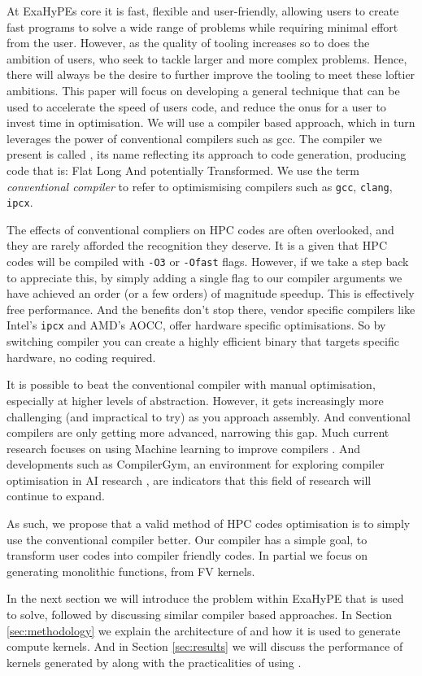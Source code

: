 At ExaHyPEs core it is fast, flexible and user-friendly, allowing users to create fast programs to solve a wide range of problems while requiring minimal effort from the user.
However, as the quality of tooling increases so to does the ambition of users, who seek to tackle larger and more complex problems.
Hence, there will always be the desire to further improve the tooling to meet these loftier ambitions.
This paper will focus on developing a general technique that can be used to accelerate the speed of users code, and reduce the onus for a user to invest time in optimisation.
We will use a compiler based approach, which in turn leverages the power of conventional compilers such as gcc.
The compiler we present is called \phlat, its name reflecting its approach to code generation, producing code that is: Flat Long And potentially Transformed. 
We use the term \textit{conventional compiler} to refer to optimismising compilers such as \texttt{gcc}, \texttt{clang}, \texttt{ipcx}.  


The effects of conventional compliers on HPC codes are often overlooked, and they are rarely afforded the recognition they deserve.
It is a given that HPC codes will be compiled with \texttt{-O3} or \texttt{-Ofast} flags.
However, if we take a step back to appreciate this, by simply adding a single flag to our compiler arguments we have achieved an order (or a few orders) of magnitude speedup.
This is effectively free performance.
And the benefits don't stop there, vendor specific compilers like Intel's \texttt{ipcx} and AMD's AOCC, offer hardware specific optimisations.
So by switching compiler you can create a highly efficient binary that targets specific hardware, no coding required.

It is possible to beat the conventional compiler with manual optimisation, especially at higher levels of abstraction.
However, it gets increasingly more challenging (and impractical to try) as you approach assembly.
And conventional compilers are only getting more advanced, narrowing this gap.   
Much current research focuses on using Machine learning to improve compilers \cite{compiler-ml-opt,lots-of-compiler-options}.
And developments such as CompilerGym, an environment for exploring compiler optimisation in AI research \cite{compiler-gym}, are indicators that this field of research will continue to expand. 

As such, we propose that a valid method of HPC codes optimisation is to simply use the conventional compiler better.
Our \phlat compiler has a simple goal, to transform user codes into compiler friendly codes.    
In partial we focus on generating monolithic functions, from FV kernels.

In the next section we will introduce the problem within ExaHyPE that \phlat is used to solve, followed by discussing similar compiler based approaches.
In Section \ref{sec:methodology} we explain the architecture of \phlat and how it is used to generate compute kernels.
And in Section \ref{sec:results} we will discuss the performance of kernels generated by \phlat along with the practicalities of using \phlat. 